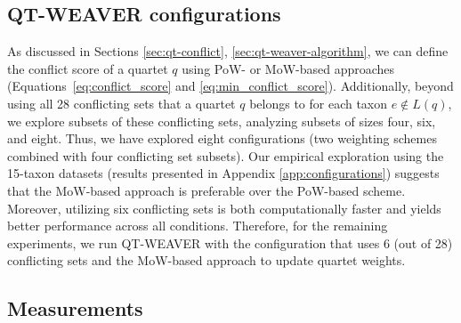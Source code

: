 \documentclass[10pt,a4paper]{article}
\begin{document}
 

 
\subsection{QT-WEAVER configurations}
\label{sec:qt-weaver-configuration}

As discussed in Sections \ref{sec:qt-conflict}, \ref{sec:qt-weaver-algorithm}, we can define the conflict score of a quartet $q$ using PoW- or MoW-based approaches (Equations~\ref{eq:conflict_score} and \ref{eq:min_conflict_score}). %
Additionally, beyond using all 28 conflicting sets that a quartet $q$ belongs to for each taxon $e \notin L(q)$, we explore subsets of these conflicting sets, analyzing subsets of sizes four, six, and eight. Thus, we have explored eight configurations (two weighting schemes combined with four conflicting set subsets). Our empirical exploration using the 15-taxon datasets (results presented in Appendix \ref{app:configurations}) suggests that the MoW-based approach is preferable over the PoW-based scheme. Moreover, utilizing six conflicting sets is both computationally faster and yields better performance across all conditions. Therefore, for the remaining experiments, we run QT-WEAVER with the configuration that uses 6 (out of 28) conflicting sets and the MoW-based approach to update quartet weights.

\subsection{Measurements}
\end{document}
